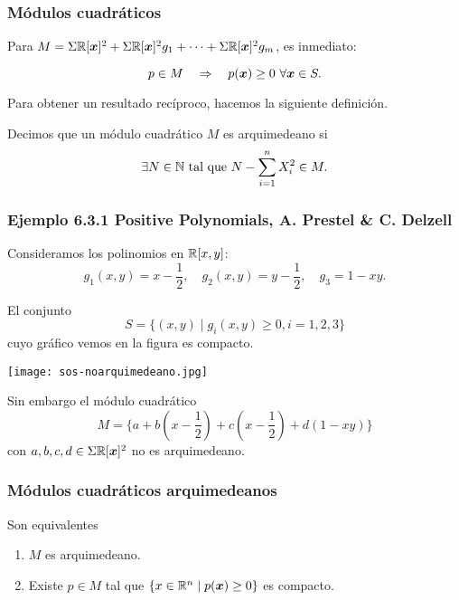 \documentclass[aspectratio=169,12pt,spanish]{beamer}
\begin{document}

\begin{frame}

\frametitle{Módulos cuadráticos}

Para $M = \Sigma\mathbb{R}[\bm{x}]^2 + \Sigma\mathbb{R}[\bm{x}]^2 g_1 + \cdots +  \Sigma\mathbb{R}[\bm{x}]^2 g_m$, es inmediato:

$$
p \in M \quad \Rightarrow  \quad p(\bm{x}) \ge 0 \ \forall \bm{x} \in S.
$$

Para obtener un resultado recíproco, hacemos la siguiente definición.

\begin{definition}
Decimos que un módulo cuadrático $M$ es arquimedeano si
\begin{align}
\label{compacto}
\exists N \in \mathbb{N} \text{ tal que } N - \sum_{i=1}^n X_i^2 \in M.
\end{align}
\end{definition}


\end{frame}


\begin{frame}

\frametitle{Ejemplo 6.3.1 Positive Polynomials, A. Prestel \& C. Delzell}
Consideramos los polinomios en $\mathbb{R}[x,y]$:
$$
g_1(x,y) = x - \frac{1}{2}, \quad g_2(x,y) = y - \frac{1}{2}, \quad g_3 = 1-xy.
$$

\begin{minipage}{0.45\textwidth}
El conjunto
$$S = \{(x,y) \mid g_i(x,y) \ge 0, i = 1, 2, 3 \}$$ cuyo gráfico vemos en la figura es compacto.
\end{minipage}\hfill
\begin{minipage}{0.45\textwidth}
\begin{center}
\texttt{[image: sos-noarquimedeano.jpg]}
\end{center}
\end{minipage}

Sin embargo el módulo cuadrático
$$
M = \{a + b (x - \frac{1}{2}) + c (x-\frac{1}{2}) + d (1 - xy) \}
$$
con $a,b,c,d \in \Sigma\mathbb{R}[\bm{x}]^2$ no es arquimedeano.
\end{frame}


\begin{frame}

\frametitle{Módulos cuadráticos arquimedeanos}

Son equivalentes

\begin{enumerate}
\item $M$ es arquimedeano.
\item Existe $p \in M$ tal que $\{x \in \mathbb{R}^n \mid p(\bm{x}) \ge 0\}$ es compacto.
\end{enumerate}

\end{frame}
\end{document}
